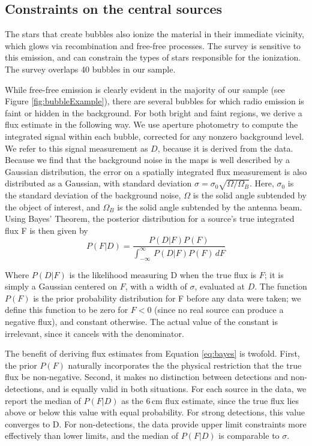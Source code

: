 \subsection {Constraints on the central sources}
\label{sec:central sources}

The stars that create bubbles also ionize the material in their immediate vicinity, which
glows via recombination and free-free processes. The \vla \magpis survey is sensitive to this emission,
and can constrain the types of stars responsible for the ionization. The \magpis survey overlaps 40 bubbles in our sample.

While free-free emission is clearly evident in the majority of our sample
(see Figure \ref{fig:bubbleExample}), there are several bubbles for which radio emission is faint or hidden
in the background. For both bright and faint \hii regions, we derive a flux estimate in the following way. We use aperture photometry to compute
the integrated signal within each bubble, corrected for any nonzero background level. We refer to this signal measurement as $D$, because it is derived
from the data. Because we find that the background noise in the
\magpis maps is well described by a Gaussian distribution, the error on a spatially integrated flux measurement is also distributed as a Gaussian,
with standard deviation $\sigma = \sigma_0 \sqrt{\Omega / \Omega_B}$. Here, $\sigma_0$ is the standard deviation of the background noise, $\Omega$ is the solid angle
subtended by the object of interest, and $\Omega_B$ is the solid angle subtended by the antenna beam. Using Bayes' Theorem, the posterior distribution for
a source's true integrated flux F is then given by
\begin{equation}
\label{eq:bayes}
P(F | D) = \frac{P(D | F)P(F)}{\int_{-\infty}^\infty\,P(D | F)P(F)\,dF}
\end{equation}

\noindent Where $P(D|F)$ is the likelihood measuring D when the true flux is $F$; it is simply a Gaussian centered on $F$, with a width of $\sigma$, evaluated at $D$.
The function $P(F)$ is the prior probability distribution for F before any data were taken; we define this function to be zero
for $F<0$ (since no real source can produce a negative flux), and constant otherwise. The actual value of the constant is irrelevant, since it cancels with
the denominator.


The benefit of deriving flux estimates from Equation \ref{eq:bayes} is twofold. First, the prior $P(F)$ naturally incorporates the the physical
restriction that the true flux be non-negative. Second, it makes no distinction between detections and non-detections, and is equally valid
in both situations. For each source in the \magpis data, we report the median of $P(F|D)$ as the 6\,cm flux estimate, since the true flux lies above or below
this value with equal probability. For strong detections, this value converges to D. For non-detections, the data provide upper limit constraints more
effectively than lower limits, and the median of $P(F|D)$ is comparable to $\sigma$.

